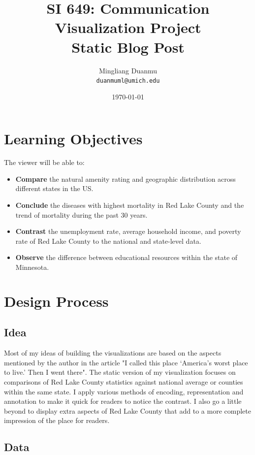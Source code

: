 \documentclass{article}
\title{SI 649: Communication Visualization Project \\ Static Blog Post} %
\author{Mingliang Duanmu\\ \texttt{duanmuml@umich.edu}} %
\date{\today} %
\begin{document}
\maketitle %

\section{Learning Objectives}

The viewer will be able to:
\begin{itemize}
    \item \textbf{Compare} the natural amenity rating and geographic distribution across different states in the US.
    \item \textbf{Conclude} the diseases with highest mortality in Red Lake County and the trend of mortality during the past 30 years.
    \item \textbf{Contrast} the unemployment rate, average household income, and poverty rate of Red Lake County to the national and state-level data.
    \item \textbf{Observe} the difference between educational resources within the state of Minnesota.
\end{itemize}

\section{Design Process}

\subsection*{Idea}

Most of my ideas of building the visualizations are based on the aspects mentioned by the author in the article "I called this place ‘America’s worst place to live.’ Then I went there". The static version of my visualization focuses on comparisons of Red Lake County statistics against national average or counties within the same state. I apply various methods of encoding, representation and annotation to make it quick for readers to notice the contrast. I also go a little beyond to display extra aspects of Red Lake County that add to a more complete impression of the place for readers.

\subsection*{Data}
\end{document}
